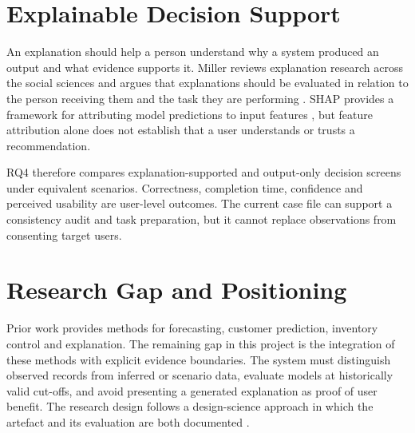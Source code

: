\section{Explainable Decision Support}
An explanation should help a person understand why a system produced an output and what evidence supports it. Miller reviews explanation research across the social sciences and argues that explanations should be evaluated in relation to the person receiving them and the task they are performing \citep{miller2019explanation}. SHAP provides a framework for attributing model predictions to input features \citep{lundberg2017shap}, but feature attribution alone does not establish that a user understands or trusts a recommendation.

RQ4 therefore compares explanation-supported and output-only decision screens under equivalent scenarios. Correctness, completion time, confidence and perceived usability are user-level outcomes. The current case file can support a consistency audit and task preparation, but it cannot replace observations from consenting target users.

\section{Research Gap and Positioning}
Prior work provides methods for forecasting, customer prediction, inventory control and explanation. The remaining gap in this project is the integration of these methods with explicit evidence boundaries. The system must distinguish observed records from inferred or scenario data, evaluate models at historically valid cut-offs, and avoid presenting a generated explanation as proof of user benefit. The research design follows a design-science approach in which the artefact and its evaluation are both documented \citep{hevner2004design}.
